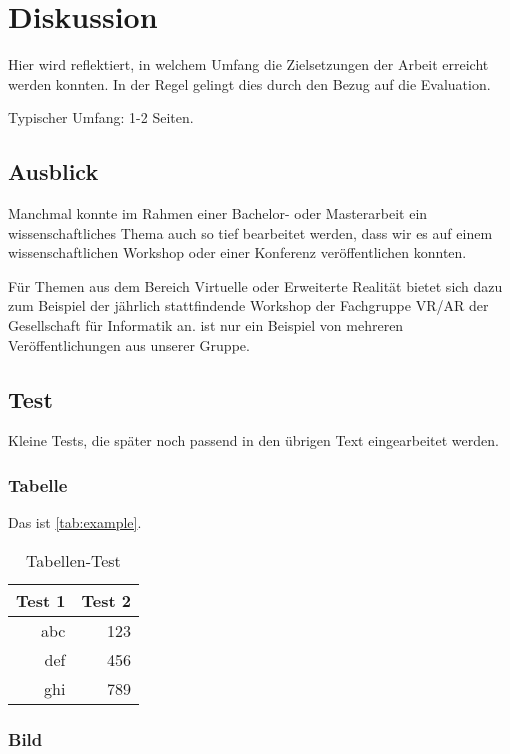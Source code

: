 \chapter{Diskussion}

Hier wird reflektiert, in welchem Umfang die Zielsetzungen der Arbeit erreicht werden konnten. In der Regel gelingt dies durch den Bezug auf die Evaluation.

Typischer Umfang: 1-2 Seiten.

\section{Ausblick}

Manchmal konnte im Rahmen einer Bachelor- oder Masterarbeit ein
wissenschaftliches Thema auch so tief bearbeitet werden, dass wir es auf einem
wissenschaftlichen Workshop oder einer Konferenz veröffentlichen konnten.

Für Themen aus dem Bereich Virtuelle oder Erweiterte Realität bietet sich dazu
zum Beispiel der jährlich stattfindende Workshop der Fachgruppe VR/AR der
Gesellschaft für Informatik an. \citet{Bluhm:Sonar:2009} ist nur ein Beispiel
von mehreren Veröffentlichungen aus unserer Gruppe.

\section{Test}
Kleine Tests, die später noch passend in den übrigen Text eingearbeitet werden.

\subsection{Tabelle}

Das ist \autoref{tab:example}.

\begin{table}[tbh]
 \centering
 \begin{tabular}{r|r}
 Test 1 & Test 2\\
 \hline
 abc & 123\\
 def & 456\\
 ghi & 789
 \end{tabular}
 \caption{Tabellen-Test}
 \label{tab:example}
\end{table}

\subsection{Bild}

